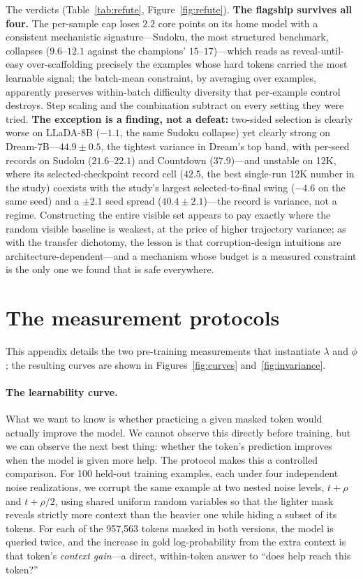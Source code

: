 \documentclass{article} %
\begin{document}
The verdicts (Table~\ref{tab:refute}, Figure~\ref{fig:refute}). \textbf{The flagship survives all four.} The per-sample cap loses $2.2$ core points on its home model with a consistent mechanistic signature---Sudoku, the most structured benchmark, collapses ($9.6$--$12.1$ against the champions' $15$--$17$)---which reads as reveal-until-easy over-scaffolding precisely the examples whose hard tokens carried the most learnable signal; the batch-mean constraint, by averaging over examples, apparently preserves within-batch difficulty diversity that per-example control destroys. Step scaling and the combination subtract on every setting they were tried. \textbf{The exception is a finding, not a defeat:} two-sided selection is clearly worse on LLaDA-8B ($-1.1$, the same Sudoku collapse) yet clearly strong on Dream-7B---$44.9 \pm 0.5$, the tightest variance in Dream's top band, with per-seed records on Sudoku ($21.6$--$22.1$) and Countdown ($37.9$)---and unstable on 12K, where its selected-checkpoint record cell ($42.5$, the best single-run 12K number in the study) coexists with the study's largest selected-to-final swing ($-4.6$ on the same seed) and a $\pm 2.1$ seed spread ($40.4 \pm 2.1$)---the record is variance, not a regime. Constructing the entire visible set appears to pay exactly where the random visible baseline is weakest, at the price of higher trajectory variance; as with the transfer dichotomy, the lesson is that corruption-design intuitions are architecture-dependent---and a mechanism whose budget is a measured constraint is the only one we found that is safe everywhere.

\section{The measurement protocols}
\label{sec:measurements}

This appendix details the two pre-training measurements that instantiate $\lambda$ and $\phi$; the resulting curves are shown in Figures~\ref{fig:curves} and~\ref{fig:invariance}.

\paragraph{The learnability curve.}
What we want to know is whether practicing a given masked token would actually improve the model. We cannot observe this directly before training, but we can observe the next best thing: whether the token's prediction improves when the model is given more help. The protocol makes this a controlled comparison. For 100 held-out training examples, each under four independent noise realizations, we corrupt the same example at two nested noise levels, $t+\rho$ and $t+\rho/2$, using shared uniform random variables so that the lighter mask reveals strictly more context than the heavier one while hiding a subset of its tokens. For each of the 957{,}563 tokens masked in both versions, the model is queried twice, and the increase in gold log-probability from the extra context is that token's \emph{context gain}---a direct, within-token answer to ``does help reach this token?''
\end{document}
